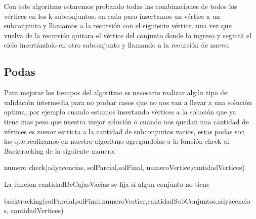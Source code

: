 Con este algoritmo estaremos probando todas las combinaciones de todos los vértices en los k subconjuntos, en cada paso insertamos un vértice a un subconjunto y llamamos a la recursión con el siguiente vértice. una vez que vuelva de la recursión quitara el vértice del conjunto donde lo ingreso y seguirá el ciclo insertándolo en otro subconjunto y llamando a la recursión de nuevo.

\subsection{Podas}
Para mejorar los tiempos del algoritmo es necesario realizar algún tipo de validación intermedia para no probar casos que no nos van a llevar a una solución optima, por ejemplo cuando estamos insertando vértices a la solución que ya tiene mas peso que nuestra mejor solución o cuando nos quedan una cantidad de vértices es menor estricta a la cantidad de subconjuntos vacíos, estas podas son las que realizamos en nuestro algoritmo agregándolas a la función check al Backtracking de la siguiente manera:

\begin{algorithm}
  \begin{algorithmic}[1]\parskip=1mm
 \caption{numero check(adyacencias, solParcial,solFinal, numeroVertice,cantidadVertices)}
  \end{algorithmic}
  \end{algorithm}
La funcion cantidadDeCajasVacias se fija si algun conjunto no tiene  
 
 \begin{algorithm}
 \begin{algorithmic}[1]\parskip=1mm
 \caption{backtracking(solParcial,solFinal,numeroVertice,cantidadSubConjuntos,adyacencias, cantidadVertices)}
  \end{algorithmic}
  \end{algorithm}

